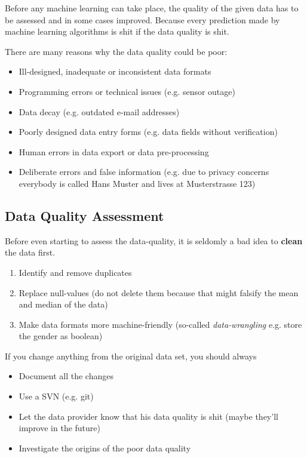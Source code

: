 \documentclass[a4paper, 11pt]{article}
\begin{document}
Before any machine learning can take place, the quality of the given data has to be assessed and in some cases improved. Because every prediction made by machine learning algorithms is shit if the data quality is shit.

There are many reasons why the data quality could be poor:

\begin{itemize}
    \item Ill-designed, inadequate or inconsistent data formats
    \item Programming errors or technical issues (e.g. sensor outage)
    \item Data decay (e.g. outdated e-mail addresses)
    \item Poorly designed data entry forms (e.g. data fields without verification)
    \item Human errors in data export or data pre-processing
    \item Deliberate errors and false information (e.g. due to privacy concerns everybody is called Hans Muster and lives at Musterstrasse 123)
\end{itemize}

\subsection{Data Quality Assessment}

Before even starting to assess the data-quality, it is seldomly a bad idea to \textbf{clean} the data first.

\begin{enumerate}
    \item Identify and remove duplicates
    \item Replace null-values (do not delete them because that might falsify the mean and median of the data)
    \item Make data formats more machine-friendly (so-called \textit{data-wrangling} e.g. store the gender as boolean)
\end{enumerate}

\newpage

If you change anything from the original data set, you should always

\begin{itemize}
    \item Document all the changes
    \item Use a SVN (e.g. git)
    \item Let the data provider know that his data quality is shit (maybe they'll improve in the future)
    \item Investigate the origins of the poor data quality
\end{itemize}
\end{document}
